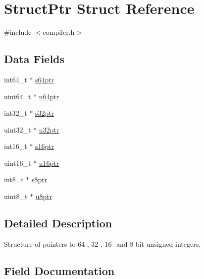 \hypertarget{struct_struct_ptr}{}\section{Struct\+Ptr Struct Reference}
\label{struct_struct_ptr}


{\ttfamily \#include $<$compiler.\+h$>$}

\subsection*{Data Fields}
\begin{DoxyCompactItemize}
\item 
int64\+\_\+t $\ast$ \mbox{\hyperlink{struct_struct_ptr_ab436f27258753b9cf149312d1e668d7e}{s64ptr}}
\item 
uint64\+\_\+t $\ast$ \mbox{\hyperlink{struct_struct_ptr_a01a7db75ae97caa7457038b8ee801d1f}{u64ptr}}
\item 
int32\+\_\+t $\ast$ \mbox{\hyperlink{struct_struct_ptr_a106ea0461fc89cf4c58cec908c448aef}{s32ptr}}
\item 
uint32\+\_\+t $\ast$ \mbox{\hyperlink{struct_struct_ptr_a00500224ac165192ac888251a076606d}{u32ptr}}
\item 
int16\+\_\+t $\ast$ \mbox{\hyperlink{struct_struct_ptr_a55c23b18ff2cf478679ca49da3927345}{s16ptr}}
\item 
uint16\+\_\+t $\ast$ \mbox{\hyperlink{struct_struct_ptr_a15c8362aa58f36ae5de7f6180550d6b5}{u16ptr}}
\item 
int8\+\_\+t $\ast$ \mbox{\hyperlink{struct_struct_ptr_a874b2108143ffd4d2a83baa5d8fa8cad}{s8ptr}}
\item 
uint8\+\_\+t $\ast$ \mbox{\hyperlink{struct_struct_ptr_acc04e057a962c975bbdf62664c52ff2c}{u8ptr}}
\end{DoxyCompactItemize}


\subsection{Detailed Description}
Structure of pointers to 64-\/, 32-\/, 16-\/ and 8-\/bit unsigned integers. 

\subsection{Field Documentation}
\mbox{\label{struct_struct_ptr_a55c23b18ff2cf478679ca49da3927345}} 
